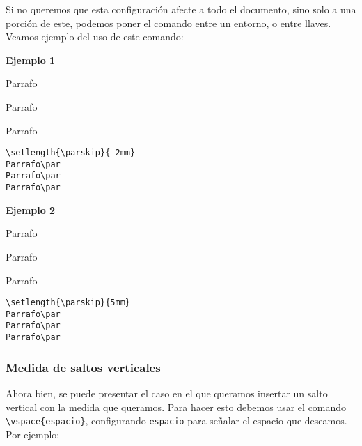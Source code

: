 	Si no queremos que esta configuración afecte a todo el documento, sino solo a una porción de este, podemos poner el comando entre un entorno, o entre llaves. Veamos ejemplo del uso de este comando:\par
	
	\textbf{Ejemplo 1}
	
	\begin{minipage}{\textwidth}
		\singlespace
		\setlength{\parskip}{0mm}
		\setlength{\parskip}{-2mm}
		Parrafo\par		
		Parrafo\par		
		Parrafo\par
	\end{minipage}

	\begin{myquote}
		\begin{lstlisting}
\setlength{\parskip}{-2mm}
Parrafo\par		
Parrafo\par		
Parrafo\par
		\end{lstlisting}
	\end{myquote}
	
	\textbf{Ejemplo 2}
	
	\begin{minipage}{\textwidth}
		\singlespace
		\setlength{\parskip}{0mm}
		\setlength{\parskip}{5mm}
		Parrafo\par		
		Parrafo\par		
		Parrafo\par
	\end{minipage}

	\begin{myquote}
		\begin{lstlisting}
\setlength{\parskip}{5mm}
Parrafo\par		
Parrafo\par		
Parrafo\par
		\end{lstlisting}
	\end{myquote}

	\subsubsection{Medida de saltos verticales}
	
	Ahora bien, se puede presentar el caso en el que queramos insertar un salto vertical con la medida que queramos. Para hacer esto debemos usar el comando \verb|\vspace{espacio}|, configurando \texttt{espacio} para señalar el espacio que deseamos. Por ejemplo:
	
